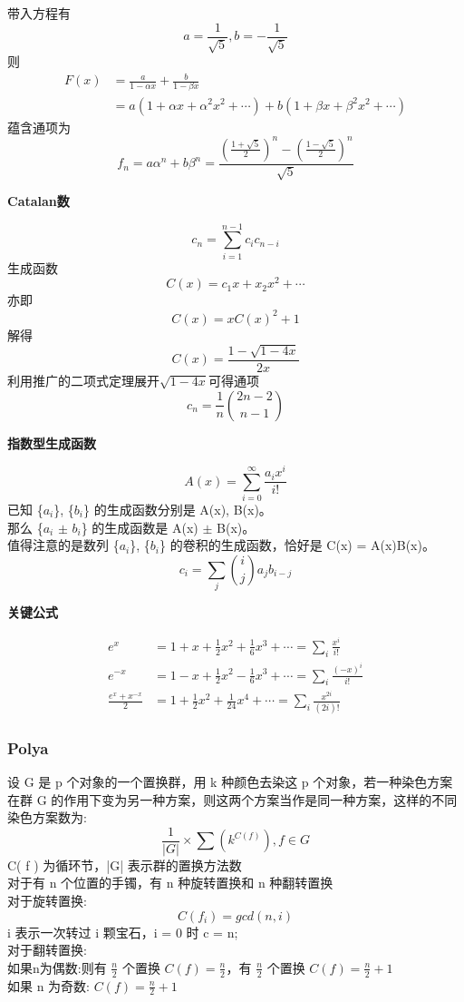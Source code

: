\documentclass[10pt]{ctexart}
\begin{document}
{{$$$$
带入方程有
$$
a = \frac{1}{\sqrt5}, b = -\frac{1}{\sqrt5}
$$
则
$$
\begin{aligned}
F(x) &= \frac{a}{1-\alpha x} + \frac{b}{1-\beta x}\\
&= a(1+\alpha x + \alpha^2x^2+\cdots) + b(1+\beta x + \beta^2x^2+\cdots)
\end{aligned}
$$
蕴含通项为
$$
f_n = a\alpha^n + b\beta^n = \frac{(\frac{1+\sqrt5}{2})^n - (\frac{1-\sqrt5}{2})^n}{\sqrt5}
$$
{\large\bfseries Catalan数\par}
$$
c_n = \sum_{i=1}^{n-1} c_ic_{n-i}
$$
生成函数
$$
C(x) = c_1x+x_2x^2+\cdots
$$
亦即
$$
C(x) = xC(x)^2 + 1
$$
解得
$$
C(x) = \frac{1 - \sqrt{1-4x}}{2x}
$$
利用推广的二项式定理展开$\sqrt{1-4x}$可得通项
$$
c_n = \frac1n \binom{2n-2}{n-1}
$$
{\Large\bfseries 指数型生成函数\par}
$$
A(x) = \sum_{i=0}^{\infty} \frac{a_ix^i}{i!}
$$
已知 \{$a_i$\}, \{$b_i$\} 的生成函数分别是 A(x), B(x)。\\
那么 \{$a_i$ $\pm$ $b_i$\} 的生成函数是 A(x) $\pm$ B(x)。 \\
值得注意的是数列 \{$a_i$\}, \{$b_i$\} 的卷积的生成函数，恰好是 C(x) = A(x)B(x)。\\
$$
c_i = \sum_j \binom{i}{j} a_jb_{i-j}
$$
{\large\bfseries 关键公式\par}
\begin{equation*}
\begin{aligned}
e^x &= 1 + x + \frac12x^2 + \frac16x^3+\cdots = \sum_i \frac{x^i}{i!}\\
e^{-x} &= 1 - x + \frac12x^2 - \frac16x^3+\cdots = \sum_i \frac{(-x)^i}{i!}\\
\frac{e^x + x^{-x}}{2} &= 1+\frac12x^2+\frac1{24}x^4+\cdots = \sum_i \frac{x^{2i}}{(2i)!}
\end{aligned}
\end{equation*}
\subsubsection{Polya}
设 G 是 p 个对象的一个置换群，用 k 种颜色去染这 p 个对象，若一种染色方案在群 G 的作用下变为另一种方案，则这两个方案当作是同一种方案，这样的不同染色方案数为:\\
$$
\frac{1}{|G|} \times \sum(k^{C(f)}), f \in G
$$
C( f ) 为循环节，|G| 表示群的置换方法数\\
对于有 n 个位置的手镯，有 n 种旋转置换和 n 种翻转置换\\
对于旋转置换:\\
$$
C(f_i) = gcd(n, i)
$$
i 表示一次转过 i 颗宝石，i = 0 时 c = n;\\
对于翻转置换:\\
如果n为偶数:则有 $\frac n2$ 个置换 $C(f)=\frac n2$，有 $\frac n2$ 个置换 $C(f)=\frac n2 +1$\\
如果 n 为奇数: $C(f) = \frac n2 + 1$\\
}}
\end{document}
